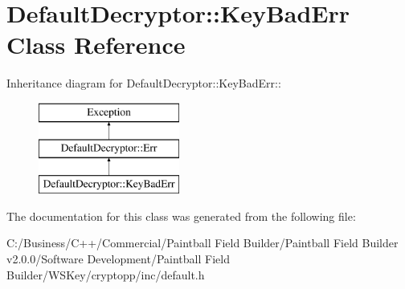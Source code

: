 \hypertarget{class_default_decryptor_1_1_key_bad_err}{
\section{DefaultDecryptor::KeyBadErr Class Reference}
\label{class_default_decryptor_1_1_key_bad_err}
}
Inheritance diagram for DefaultDecryptor::KeyBadErr::\begin{figure}[H]
\begin{center}
\leavevmode
\includegraphics[height=3cm]{class_default_decryptor_1_1_key_bad_err}
\end{center}
\end{figure}


The documentation for this class was generated from the following file:\begin{DoxyCompactItemize}
\item 
C:/Business/C++/Commercial/Paintball Field Builder/Paintball Field Builder v2.0.0/Software Development/Paintball Field Builder/WSKey/cryptopp/inc/default.h\end{DoxyCompactItemize}
